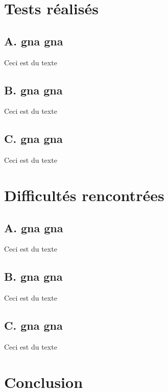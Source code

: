 \documentclass[12pt]{article}
\begin{document}
		\clearpage
		
	\section{Tests réalisés}    

		\subsection{ A. gna gna}
		
		Ceci est du texte
		
		\subsection{ B. gna gna}
		
		Ceci est du texte
		
		\subsection{ C. gna gna}
		
		Ceci est du texte
		
		\clearpage
		
	\section{Difficultés rencontrées}    

		\subsection{ A. gna gna}
		
		Ceci est du texte
		
		\subsection{ B. gna gna}
		
		Ceci est du texte
		
		\subsection{ C. gna gna}
		
		Ceci est du texte
		
		\clearpage

	\section{Conclusion}
	
\end{document}
